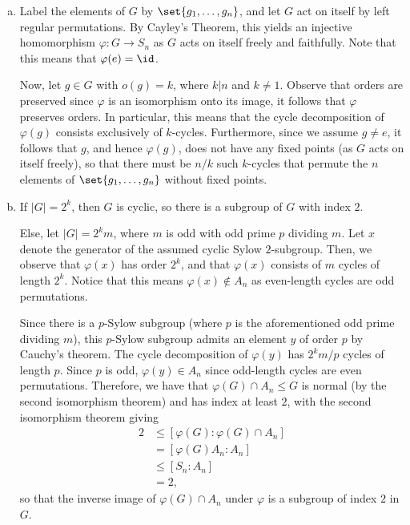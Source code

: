 \documentclass[10pt]{mypackage}
\begin{document}
\begin{solution}\hfill
  \begin{enumerate}[(a)]
    \item Label the elements of $G$ by $\set{g_1,\dots,g_n}$, and let $G$ act on itself by left regular permutations. By Cayley's Theorem, this yields an injective homomorphism $\varphi\colon G\rightarrow S_n$ as $G$ acts on itself freely and faithfully. Note that this means that $\varphi(e) = \id$.

      Now, let $g\in G$ with $o(g) = k$, where $k | n$ and $k\neq 1$. Observe that orders are preserved since $\varphi$ is an isomorphism onto its image, it follows that $\varphi$ preserves orders. In particular, this means that the cycle decomposition of $\varphi(g)$ consists exclusively of $k$-cycles. Furthermore, since we assume $g\neq e$, it follows that $g$, and hence $\varphi(g)$, does not have any fixed points (as $G$ acts on itself freely), so that there must be $n/k$ such $k$-cycles that permute the $n$ elements of $\set{g_1,\dots,g_n}$ without fixed points.
    \item If $\left\vert G \right\vert = 2^{k}$, then $G$ is cyclic, so there is a subgroup of $G$ with index $2$.

      Else, let $\left\vert G \right\vert = 2^{k}m$, where $m$ is odd with odd prime $p$ dividing $m$. Let $x$ denote the generator of the assumed cyclic Sylow $2$-subgroup. Then, we observe that $\varphi(x)$ has order $2^{k}$, and that $\varphi(x)$ consists of $m$ cycles of length $2^{k}$. Notice that this means $\varphi(x)\notin A_n$ as even-length cycles are odd permutations.

      Since there is a $p$-Sylow subgroup (where $p$ is the aforementioned odd prime dividing $m$), this $p$-Sylow subgroup admits an element $y$ of order $p$ by Cauchy's theorem. The cycle decomposition of $\varphi(y)$ has $2^{k}m/p$ cycles of length $p$. Since $p$ is odd, $\varphi(y) \in A_n$ since odd-length cycles are even permutations. Therefore, we have that $\varphi(G)\cap A_n\leq G$ is normal (by the second isomorphism theorem) and has index at least $2$, with the second isomorphism theorem giving
      \begin{align*}
        2 &\leq \left[ \varphi(G):\varphi\left( G \right)\cap A_n \right]\\
          &= \left[ \varphi(G)A_n:A_n \right]\\
          &\leq \left[ S_n:A_n \right]\\
          &= 2,
      \end{align*}
      so that the inverse image of $\varphi(G)\cap A_n$ under $\varphi$ is a subgroup of index $2$ in $G$.
  \end{enumerate}
\end{solution}
\end{document}
